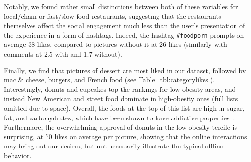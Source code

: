 \documentclass{sig-alternate-2013}
\begin{document}
Notably, we found rather small distinctions between both of these variables for local/chain or fast/slow food restaurants, suggesting that the restaurants themselves affect the social engagement much less than the user's presentation of the experience in a form of hashtags. Indeed, the hashtag \texttt{\#foodporn} prompts on average 38 likes, compared to pictures without it at 26 likes (similarly with comments at 2.5 with and 1.7 without).

Finally, we find that pictures of dessert are most liked in our dataset, followed by mac \& cheese, burgers, and French food (see Table~\ref{tbl:categorylikes}). Interestingly, donuts and cupcakes top the rankings for low-obesity areas, and instead New American and street food dominate in high-obesity ones (full lists omitted due to space). Overall, the foods at the top of this list are high in sugar, fat, and carbohydrates, which have been shown to have addictive properties~\cite{drewnowski1992taste,ventura2014neurobiologic}. Furthermore, the overwhelming approval of donuts in the low-obesity tercile is surprising, at 70 likes on average per picture, showing that the online interactions may bring out our desires, but not necessarily illustrate the typical offline behavior.
\end{document}
